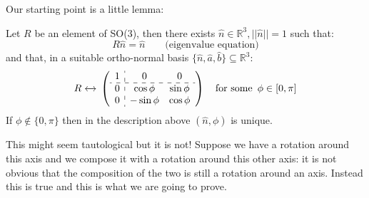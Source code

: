 \documentclass[../main.tex]{subfiles}
\begin{document}
Our starting point is a little lemma:
\begin{lemma}
Let $R$ be an element of SO(3), then there exists $\hat{n}\in\mathbb{R}^3,||\hat{n}||=1$ such that:
\[
R\hat{n}=\hat{n} \qquad \text{(eigenvalue equation)}
\]
and that, in a suitable ortho-normal basis $\{\hat{n},\hat{a},\hat{b}\}\subseteq\mathbb{R}^3$:
\[
R\xleftrightarrow[]{}{}\left(\begin{array}{c:cc}
    1 & 0 & 0 \\
    \hdashline
    0 & \cos\phi & \sin\phi \\
    0 & -\sin\phi & \cos\phi
\end{array}
\right)\quad \text{for some }\,\phi\in[0,\pi]
\]
If $\phi\not\in\{0,\pi\}$ then in the description above $(\hat{n},\phi)$ is unique.
\end{lemma}
This might seem tautological but it is not! Suppose we have a rotation around this axis and we compose it with a rotation around this other axis: it is not obvious that the composition of the two is still a rotation around an axis. Instead this is true and this is what we are going to prove.
\end{document}
